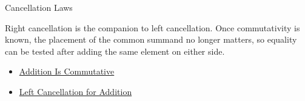 \begin{topicbox}{Cancellation Laws}
\begin{remark*}[Interpretation]
Right cancellation is the companion to left cancellation. Once commutativity
is known, the placement of the common summand no longer matters, so equality
can be tested after adding the same element on either side.
\end{remark*}

\begin{dependencies}
\begin{itemize}
  \item \hyperref[thm:addition-commutative]{Addition Is Commutative}
  \item \hyperref[thm:addition-left-cancellation]{Left Cancellation for Addition}
\end{itemize}
\end{dependencies}
\end{topicbox}

